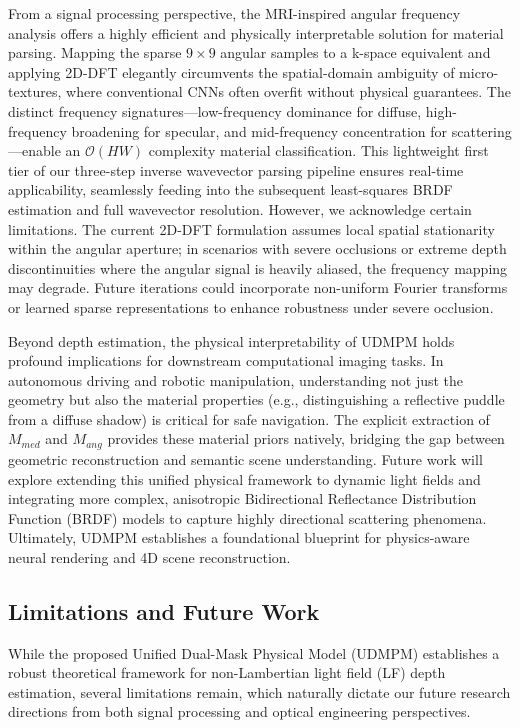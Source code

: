 From a signal processing perspective, the MRI-inspired angular frequency analysis offers a highly efficient and physically interpretable solution for material parsing. Mapping the sparse $9 \times 9$ angular samples to a k-space equivalent and applying 2D-DFT elegantly circumvents the spatial-domain ambiguity of micro-textures, where conventional CNNs often overfit without physical guarantees. The distinct frequency signatures—low-frequency dominance for diffuse, high-frequency broadening for specular, and mid-frequency concentration for scattering—enable an $\mathcal{O}(HW)$ complexity material classification. This lightweight first tier of our three-step inverse wavevector parsing pipeline ensures real-time applicability, seamlessly feeding into the subsequent least-squares BRDF estimation and full wavevector resolution. However, we acknowledge certain limitations. The current 2D-DFT formulation assumes local spatial stationarity within the angular aperture; in scenarios with severe occlusions or extreme depth discontinuities where the angular signal is heavily aliased, the frequency mapping may degrade. Future iterations could incorporate non-uniform Fourier transforms or learned sparse representations to enhance robustness under severe occlusion.

Beyond depth estimation, the physical interpretability of UDMPM holds profound implications for downstream computational imaging tasks. In autonomous driving and robotic manipulation, understanding not just the geometry but also the material properties (e.g., distinguishing a reflective puddle from a diffuse shadow) is critical for safe navigation. The explicit extraction of $M_{med}$ and $M_{ang}$ provides these material priors natively, bridging the gap between geometric reconstruction and semantic scene understanding. Future work will explore extending this unified physical framework to dynamic light fields and integrating more complex, anisotropic Bidirectional Reflectance Distribution Function (BRDF) models to capture highly directional scattering phenomena. Ultimately, UDMPM establishes a foundational blueprint for physics-aware neural rendering and 4D scene reconstruction.

\subsection{Limitations and Future Work}

While the proposed Unified Dual-Mask Physical Model (UDMPM) establishes a robust theoretical framework for non-Lambertian light field (LF) depth estimation, several limitations remain, which naturally dictate our future research directions from both signal processing and optical engineering perspectives.

